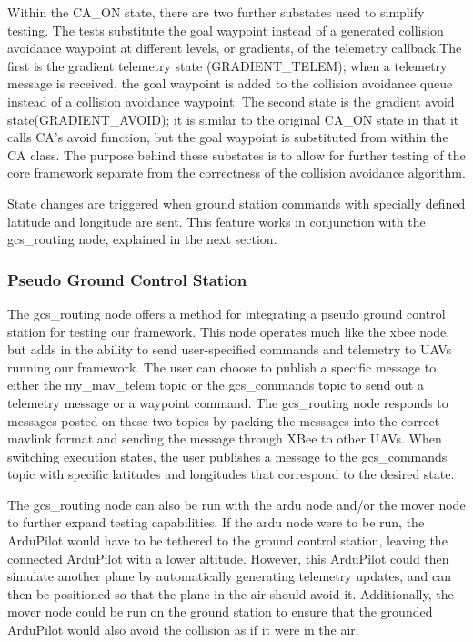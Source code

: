 \documentclass[conference]{IEEEtran}
\begin{document}
Within the CA\_ON state, there are two further substates used to simplify testing. The tests substitute the goal waypoint instead of a generated collision avoidance waypoint at different levels, or gradients, of the telemetry callback.The first is the gradient telemetry state (GRADIENT\_TELEM); when a telemetry message is received, the goal waypoint is added to the collision avoidance queue instead of a collision avoidance waypoint. The second state is the gradient avoid state(GRADIENT\_AVOID); it is similar to the original CA\_ON state in that it calls CA’s avoid function, but the goal waypoint is substituted from within the CA class. The purpose behind these substates is to allow for further testing of the core framework separate from the correctness of the collision avoidance algorithm.

State changes are triggered when ground station commands with specially defined latitude and longitude are sent. This feature works in conjunction with the gcs\_routing node, explained in the next section.


\subsubsection{Pseudo Ground Control Station}

The gcs\_routing node offers a method for integrating a pseudo ground control station for testing our framework.  This node operates much like the xbee node, but adds in the ability to send user-specified commands and telemetry to UAVs running our framework.  The user can choose to publish a specific message to either the my\_mav\_telem topic or the gcs\_commands topic to send out a telemetry message or a waypoint command.  The gcs\_routing node responds to messages posted on these two topics by packing the messages into the correct mavlink format and sending the message through XBee to other UAVs.  When switching execution states, the user publishes a message to the gcs\_commands topic with specific latitudes and longitudes that correspond to the desired state.  

The gcs\_routing node can also be run with the ardu node and/or the mover node to further expand testing capabilities.  If the ardu node were to be run, the ArduPilot would have to be tethered to the ground control station, leaving the connected ArduPilot with a lower altitude.  However, this ArduPilot could then simulate another plane by automatically generating telemetry updates, and can then be positioned so that the plane in the air should avoid it.  Additionally, the mover node could be run on the ground station to ensure that the grounded ArduPilot would also avoid the collision as if it were in the air.
\end{document}
